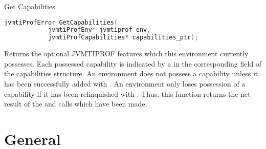 \begin{apidef}{Get Capabilities}
\begin{lstlisting}[language=C]
jvmtiProfError GetCapabilities(
            jvmtiProfEnv* jvmtiprof_env,
            jvmtiProfCapabilities* capabilities_ptr);
\end{lstlisting}

\begin{apidesc}
Returns the optional JVMTIPROF features which this environment currently possesses. Each possessed capability is indicated by a  in the corresponding field of the capabilities structure. An environment does not possess a capability unless it has been successfully added with . An environment only loses possession of a capability if it has been relinquished with . Thus, this function returns the net result of the  and  calls which have been made. 
\end{apidesc}

\begin{apiphase}
\apiphaseany
\end{apiphase}

\begin{apicap}
\apicaprequired
\end{apicap}

\begin{apiparam}
\end{apiparam}

\begin{apierror}
\end{apierror}
\end{apidef}

\section{General}

